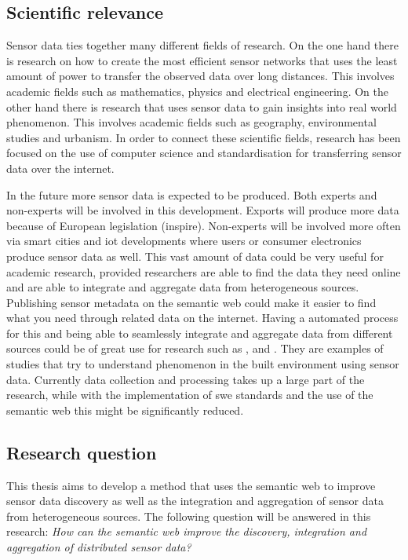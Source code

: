 \subsection{Scientific relevance}
Sensor data ties together many different fields of research. On the one hand there is research on how to create the most efficient sensor networks that uses the least amount of power to transfer the observed data over long distances. This involves academic fields such as mathematics, physics and electrical engineering. On the other hand there is research that uses sensor data to gain insights into real world phenomenon. This involves academic fields such as geography, environmental studies and urbanism. In order to connect these scientific fields, research has been focused on the use of computer science and standardisation for transferring sensor data over the internet. 

In the future more sensor data is expected to be produced. Both experts and non-experts will be involved in this development. Exports will produce more data because of European legislation (\ac{inspire}). Non-experts will be involved more often via smart cities and \ac{iot} developments where users or consumer electronics produce sensor data as well. This vast amount of data could be very useful for academic research, provided researchers are able to find the data they need online and are able to integrate and aggregate data from heterogeneous sources. Publishing sensor metadata on the semantic web could make it easier to find what you need through related data on the internet. Having a automated process for this and being able to seamlessly integrate and aggregate data from different sources could be of great use for research such as \cite{UC:vanderHoeven}, \cite{UC:Hotterdam} and \cite{UC:Theunisse}. They are examples of studies that try to understand phenomenon in the built environment using sensor data. Currently data collection and processing takes up a large part of the research, while with the implementation of \ac{swe} standards and the use of the semantic web this might be significantly reduced.  

\subsection{Research question}
This thesis aims to develop a method that uses the semantic web to improve sensor data discovery as well as the integration and aggregation of sensor data from heterogeneous sources. The following question will be answered in this research:   
\textit{How can the semantic web improve the discovery, integration and aggregation of distributed sensor data?} 
